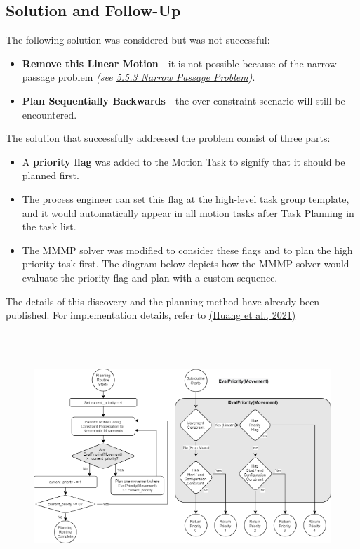\documentclass[11pt]{book}
\begin{document}
\subsection{Solution and Follow-Up}

The following solution was considered but was not successful:

\begin{itemize}
	\item \textbf{Remove this Linear Motion }- it is not possible because of the narrow passage problem \textit{\textcolor[HTML]{B7B7B7}{(see \uline{5.5.3 Narrow Passage Problem})}}. 

	\item \textbf{Plan Sequentially Backwards} - the over constraint scenario will still be encountered.

\end{itemize}
The solution that successfully addressed the problem consist of three parts:

\begin{itemize}
	\item A \textbf{priority flag }was added to the Motion Task to signify that it should be planned first. 

	\item The process engineer can set this flag at the high-level task group template, and it would automatically appear in all motion tasks after Task Planning in the task list.

	\item The MMMP solver was modified to consider these flags and to plan the high priority task first. The diagram below depicts how the MMMP solver would evaluate the priority flag and plan with a custom sequence.

\end{itemize}
The details of this discovery and the planning method have already been published. For implementation details, refer to \href{https://www.zotero.org/google-docs/?W31fOF}{(Huang et al., 2021)}

\begin{figure}[H]
\includegraphics[width=15.92cm,height=9.35cm]{./images/image62.png}
\end{figure}
\end{document}
